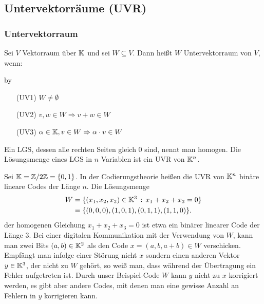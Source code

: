 \clearpage
\subsection{Untervektorräume (UVR)}
\subsubsection{Untervektorraum}

Sei $ V $ Vektorraum über $ \mathbb K $ und sei $ W \subseteq V $. Dann heißt $ W $ Untervektorraum von $ V $, wenn:

\advance\myindent by \the{}

\begin{itemize}[leftmargin=\myindent]
	\item[(UV1)]
		$ W \neq \emptyset $
	\item[(UV2)]
		$ v,w \in W \Rightarrow v+w \in W $
	\item[(UV3)]
		$ \alpha \in \mathbb K, v \in W \Rightarrow \alpha \cdot v \in W $
\end{itemize}

\begin{bem}
Ein LGS, dessen alle rechten Seiten gleich $0$ sind, nennt man homogen. Die Lösungsmenge eines LGS in $n$ Variablen ist ein UVR von $\mathbb K^n$. 
\end{bem}

\begin{bsp}
	Sei $\mathbb K = \mathbb Z/ 2 \mathbb Z = \{0,1\}$. In der Codierungstheorie heißen die UVR von $\mathbb K^n$ binäre lineare Codes der Länge $n$. Die Lösungsmenge 
	\begin{align*}
		W & = \{ (x_1,x_2,x_3) \in \mathbb K^3 \,:\, x_1 + x_2 + x_3 = 0 \}
		\\ & = \{ (0,0,0), (1,0,1), (0,1,1), (1,1,0) \}. 
	\end{align*}
	der homogenen Gleichung $x_1 + x_2 + x_3=0$ 
	ist etwa ein binärer linearer Code der Länge $3$. Bei einer digitalen Kommunikation mit der Verwendung von $W$, kann man zwei Bits $(a,b) \in \mathbb K^2$ als den Code $x=(a, b, a+b) \in W$ verschicken. Empfängt man infolge einer Störung nicht $x$ sondern einen anderen Vektor $y \in \mathbb K^3$, der nicht zu $W$ gehört, so weiß man, dass während der Übertragung ein Fehler aufgetreten ist. Durch unser Beispiel-Code $W$ kann $y$ nicht zu $x$ korrigiert werden, es gibt aber andere Codes, mit denen man eine gewisse Anzahl an Fehlern in $y$ korrigieren kann. 
\end{bsp} 

